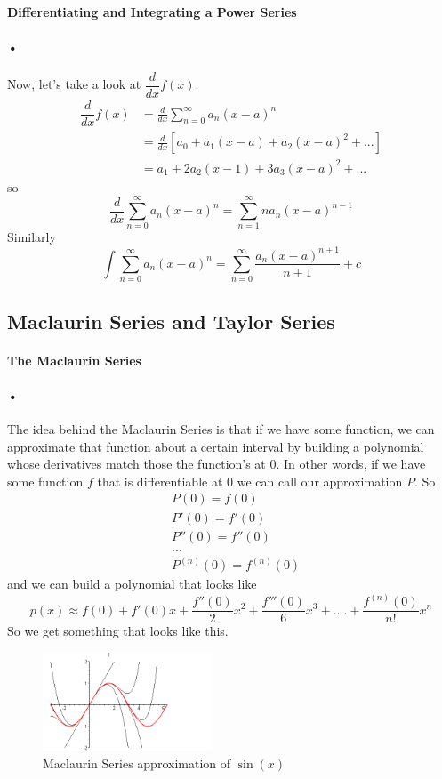 \documentclass[font =22]{report}
\begin{document}
\paragraph{Differentiating and Integrating a Power Series}
\paragraph{•}
Now, let's take a look at $\dfrac{d}{dx} f(x)$.
\begin{align*}
\dfrac{d}{dx} f(x) &= \frac{d}{dx} \sum_{n=0}^\infty a_n(x-a)^n\\
& = \frac{d}{dx}[a_0+a_1(x-a)+a_2(x-a)^2+...]\\
& = a_1 + 2a_2(x-1)+ 3a_3(x-a)^2+...
\end{align*}
so 
\[
\frac{d}{dx} \sum_{n=0}^\infty a_n(x-a)^n = \sum_{n=1}^\infty na_n(x-a)^{n-1}
\]
Similarly 
\[
\int \sum_{n=0}^\infty a_n(x-a)^n = \sum_{n=0}^\infty \frac{a_n(x-a)^{n+1}}{n+1} + c
\]
\subsection*{Maclaurin Series and Taylor Series}

\paragraph{The Maclaurin Series}
\paragraph{•}
The idea behind the Maclaurin Series is that if we have some function, we can approximate that function about a certain interval by building a polynomial whose derivatives match those the function's at 0. In other words, if we have some function $f$ that is differentiable at $0$ we can call our approximation $P$. So
\begin{align*}
&P(0) = f(0)\\
&P'(0) = f'(0)\\
&P''(0) = f''(0)\\
&...\\
&P^{(n)}(0) = f^{(n)}(0)
\end{align*}
and we can build a polynomial that looks like
\[
p(x) \approx f(0) + f'(0)x + \frac{f''(0)}{2}x^2 + \frac{f'''(0)}{6}x^3 +....+ \dfrac{f^{(n)}(0)}{n!}x^n
\]
So we get something that looks like this.
\begin{figure}[H]
\includegraphics[width=0.45\textwidth]{figures/Taylor1}
\caption{Maclaurin Series approximation of $\sin(x)$}
\end{figure}
\end{document}
